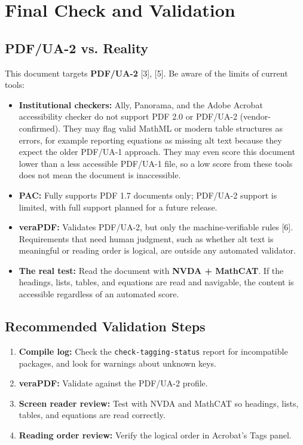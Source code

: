 \documentclass[11pt]{article}
\begin{document}
\section{Final Check and Validation}
\label{sec:validation}

\subsection{PDF/UA-2 vs. Reality}
This document targets \textbf{PDF/UA-2} [3], [5]. Be aware of the limits of current tools:

\begin{itemize}
    \item \textbf{Institutional checkers:} Ally, Panorama, and the Adobe Acrobat accessibility checker do not support PDF 2.0 or PDF/UA-2 (vendor-confirmed). They may flag valid MathML or modern table structures as errors, for example reporting equations as missing alt text because they expect the older PDF/UA-1 approach. They may even score this document lower than a less accessible PDF/UA-1 file, so a low score from these tools does not mean the document is inaccessible.
    \item \textbf{PAC:} Fully supports PDF 1.7 documents only; PDF/UA-2 support is limited, with full support planned for a future release.
    \item \textbf{veraPDF:} Validates PDF/UA-2, but only the machine-verifiable rules [6]. Requirements that need human judgment, such as whether alt text is meaningful or reading order is logical, are outside any automated validator.
    \item \textbf{The real test:} Read the document with \textbf{NVDA + MathCAT}. If the headings, lists, tables, and equations are read and navigable, the content is accessible regardless of an automated score.
\end{itemize}

\subsection{Recommended Validation Steps}
\begin{enumerate}
    \item \textbf{Compile log:} Check the \texttt{check-tagging-status} report for incompatible packages, and look for warnings about unknown keys.
    \item \textbf{veraPDF:} Validate against the PDF/UA-2 profile.
    \item \textbf{Screen reader review:} Test with NVDA and MathCAT so headings, lists, tables, and equations are read correctly.
    \item \textbf{Reading order review:} Verify the logical order in Acrobat's Tags panel.
\end{enumerate}
\end{document}
